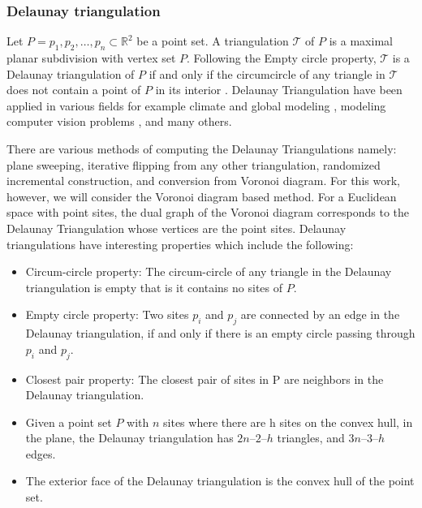 \documentclass[10pt,a4paper]{article}
\theoremstyle{plain}
\theoremstyle{definition}
\begin{document}
      
      \subsubsection{Delaunay triangulation}
      Let $P={p_1, p_2, \hdots,p_n} \subset \mathbb{R}^2$ be a point set. A triangulation $\mathcal{T}$ of $P$ is a maximal planar subdivision with vertex set $P$. Following the Empty circle property, $\mathcal{T}$ is a Delaunay triangulation of $P$ if and only if the circumcircle of any triangle in $\mathcal{T}$ does not contain a point of $P$ in its interior \cite{aurenhammer2000voronoi}. Delaunay Triangulation have been applied in various fields for example climate and global modeling \citep{ju2011voronoi}, modeling computer vision problems \citep{dinas2014review}, and many others.
      
      There are various methods of computing the Delaunay Triangulations namely: plane sweeping, iterative flipping from any other triangulation, randomized incremental construction, and conversion from Voronoi diagram. For this work, however, we will consider the Voronoi diagram based method. For a Euclidean space with point sites, the dual graph of the Voronoi diagram corresponds to the Delaunay Triangulation whose vertices are the point sites. 
      Delaunay triangulations have interesting properties which include the following:
      \begin{itemize}
      	\item Circum-circle property: The circum-circle of any triangle in the Delaunay triangulation
      	is empty that is it contains no sites of $P$.
      	\item Empty circle property: Two sites $p_i$ and $p_j$ are connected by an edge in the Delaunay
      	triangulation, if and only if there is an empty circle passing through $p_i$ and $p_j$.
      	\item Closest pair property: The closest pair of sites in P are neighbors in the Delaunay triangulation.
      	\item Given a point set $P$ with $n$ sites where there are h sites on the convex hull, in the plane, the Delaunay triangulation has $2n – 2 – h$ triangles, and $3n – 3 – h$ edges.
      	\item The exterior face of the Delaunay triangulation is the convex hull of the
      	point set.
      \end{itemize}
       
       
       
\end{document}
